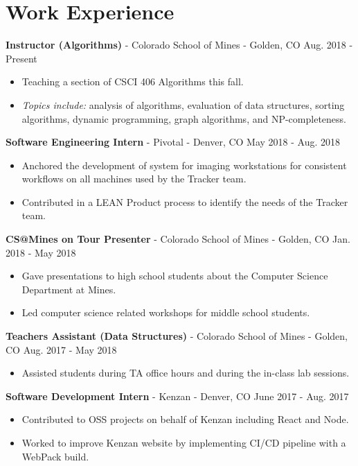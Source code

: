 \documentclass[10pt,letterpaper]{article}
\begin{document}
\section*{Work Experience}
\textbf{Instructor (Algorithms)} - Colorado School of Mines - Golden, CO
\hfill Aug. 2018 - Present
\begin{itemize}
    \item Teaching a section of CSCI 406 Algorithms this fall.
    \item \textit{Topics include:} analysis of algorithms, evaluation of data
        structures, sorting algorithms, dynamic programming, graph algorithms,
        and NP-completeness.
\end{itemize}

\textbf{Software Engineering Intern} - Pivotal - Denver, CO
\hfill May 2018 - Aug. 2018
\begin{itemize}
    \item Anchored the development of system for imaging workstations for
        consistent workflows on all machines used by the Tracker team.
    \item Contributed in a LEAN Product process to identify the needs of the
        Tracker team.
\end{itemize}

\vspace{2pt}
\textbf{CS@Mines on Tour Presenter} - Colorado School of Mines -
Golden, CO \hfill Jan. 2018 - May 2018
\begin{itemize}
    \item Gave presentations to high school students about the Computer Science
        Department at Mines.
    \item Led computer science related workshops for middle school students.
\end{itemize}

\vspace{2pt}
\textbf{Teachers Assistant (Data Structures)} - Colorado School of Mines -
Golden, CO \hfill Aug. 2017 - May 2018
\begin{itemize}
    \item Assisted students during TA office hours and during the in-class lab
        sessions.
\end{itemize}

\vspace{2pt}
\textbf{Software Development Intern} - Kenzan - Denver, CO
\hfill June 2017 - Aug. 2017
\begin{itemize}
    \item Contributed to OSS projects on behalf of Kenzan including React and
        Node.
    \item Worked to improve Kenzan website by implementing CI/CD pipeline with
        a WebPack build.
\end{itemize}
\end{document}
